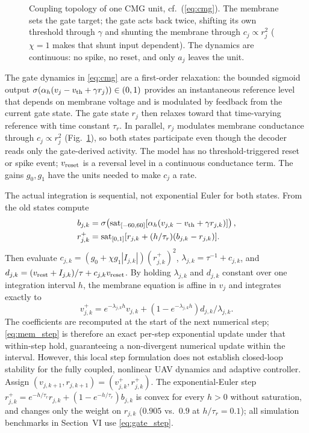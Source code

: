 \documentclass[letterpaper, 10 pt, conference]{ieeeconf}
\newcommand{\sat}{\operatorname{sat}}
\begin{document}
\begin{figure}[t]
\centering
\resizebox{0.86\columnwidth}{!}{}
\caption{Coupling topology of one CMG unit, cf.~(\ref{eq:cmg}). The membrane sets
 the gate target; the gate acts back twice, shifting its own threshold through
 $\gamma$ and shunting the membrane through $c_j\propto r_j^2$ ($\chi=1$ makes
 that shunt input dependent). The dynamics are continuous: no spike, no reset,
 and only $a_j$ leaves the unit.}
\label{fig:cmgunit}
\end{figure}


%
The gate dynamics in \eqref{eq:cmg} are a first-order relaxation: the bounded sigmoid output $\sigma(\alpha_h(v_j-v_{\rm th}+\gamma r_j))\in(0,1)$ provides an instantaneous reference level that depends on membrane voltage and is modulated by feedback from the current gate state. The gate state $r_j$ then relaxes toward that time-varying reference with time constant $\tau_r$. In parallel, $r_j$ modulates membrane conductance through $c_j\propto r_j^2$ (Fig.~\ref{fig:cmgunit}), so both states participate even though the decoder reads only the gate-derived activity. The model has no threshold-triggered reset or spike event; $v_{\rm reset}$ is a reversal level in a continuous conductance term. The gains $g_0,g_1$ have the units needed to make $c_j$ a rate.

The actual integration is sequential, not exponential Euler for both
states. From the old states compute
\begin{align}
 b_{j,k}&=\sigma\!\left(\sat_{[-60,60]}
       [\alpha_h(v_{j,k}-v_{\rm th}+\gamma r_{j,k})]\right),\\
 r_{j,k}^{+}&=\sat_{[0,1]}
       [r_{j,k}+(h/\tau_r)(b_{j,k}-r_{j,k})].
 \label{eq:gate_step}
\end{align}
Then evaluate $c_{j,k}=(g_0+\chi g_1|I_{j,k}|)(r_{j,k}^{+})^2$,
$\lambda_{j,k}=\tau^{-1}+c_{j,k}$, and
$d_{j,k}=(v_{\rm rest}+I_{j,k})/\tau+c_{j,k}v_{\rm reset}$. By holding $\lambda_{j,k}$ and $d_{j,k}$ constant over one integration interval $h$, the membrane equation is affine in $v_j$ and integrates exactly to
\begin{equation}
 v_{j,k}^{+}=e^{-\lambda_{j,k}h}v_{j,k}
       +(1-e^{-\lambda_{j,k}h})d_{j,k}/\lambda_{j,k}.
 \label{eq:mem_step}
\end{equation}
The coefficients are recomputed at the start of the next numerical step; \eqref{eq:mem_step} is therefore an exact per-step exponential update under that within-step hold, guaranteeing a non-divergent numerical update within the interval. However, this local step formulation does not establish closed-loop stability for the fully coupled, nonlinear UAV dynamics and adaptive controller. Assign $(v_{j,k+1},r_{j,k+1})=(v_{j,k}^{+},r_{j,k}^{+})$.
The exponential-Euler step $r_{j,k}^{+}=e^{-h/\tau_r}r_{j,k}+(1-e^{-h/\tau_r})b_{j,k}$ is
convex for every $h>0$ without saturation, and changes only the weight on $r_{j,k}$
($0.905$ vs.\ $0.9$ at $h/\tau_r=0.1$); all simulation benchmarks in Section~VI use \eqref{eq:gate_step}.
\end{document}
